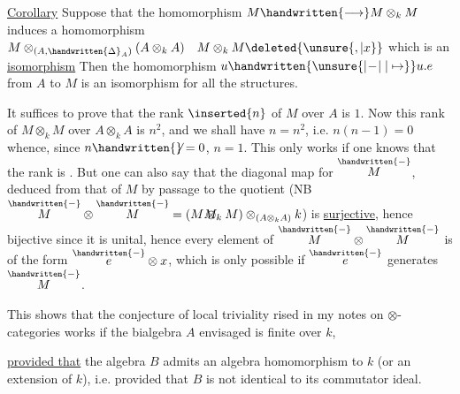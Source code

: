 
\uline{Corollary} Suppose that the homomorphism $M\handwritten{\longrightarrow}M\otimes_{k}M$ induces a homomorphism $M\otimes_{(A,\handwritten{\Delta}_{A})}(A\otimes_{k}A)\quad M\otimes_{k}M\deleted{\unsure{,|x}}$  which is an \uline{isomorphism} Then the homomorphism $u\handwritten{\unsure{\mathrel{\vert\! -\!\vert}|\mapsto}}u.e$ from $A$ to $M$ is an isomorphism for all the structures.

It suffices to prove that the rank $\inserted{n}$ of $M$ over $A$ is $1$. Now this rank of $M\otimes_{k}M$ over $A\otimes_{k}A$ is $n^{2}$, and we shall have $n=n^{2}$, i.e. $n(n-1)=0$ whence, since $n\handwritten{\not}=0$, $n=1$. This only works if one knows that the rank is . But one can also say that the diagonal map for $\overset{\handwritten{-}}{M}$, deduced from that of $M$ by passage to the quotient (NB $\overset{\handwritten{-}}{M}\otimes\overset{\handwritten{-}}{M}=(M\rlap{\(M\)}\otimes_{k}M)\otimes_{(A\otimes_{k}A)}k$) is \uline{surjective}, hence bijective since it is unital, hence every element of $\overset{\handwritten{-}}{M}\otimes\overset{\handwritten{-}}{M}$ is of the form $\overset{\handwritten{-}}{e}\otimes x$, which is only possible if $\overset{\handwritten{-}}{e}$ generates $\overset{\handwritten{-}}{M}$.

This shows that the conjecture of local triviality rised in my notes on $\otimes$-categories works if the bialgebra $A$ envisaged is finite over $k$, \uline{provided that} the algebra $B$ admits an algebra homomorphism to $k$ (or an extension of $k$), i.e. provided that $B$ is not identical to its commutator ideal.
